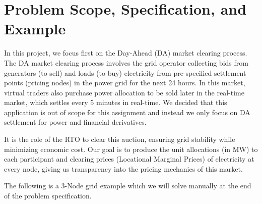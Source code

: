 \documentclass[11pt]{article}
\begin{document}
\begin{abstract}
The goal of this project is to simulate an end-to-end market clearing process for a mock electric grid, deriving electricity prices across the grid, and as an extension, clearing one auction round in the electricity derivatives market for a product called Financial Transmission Rights (FTR). We believe this application to be especially enriching to those of us exploring a career in electricity trading, as well as serving as insight into the pricing mechanics of this market in the age of surging power prices due to the rising adoption of datacenters and Artificial Intelligence.
\end{abstract}

\newpage
\tableofcontents
\newpage

\section{Problem Scope, Specification, and Example}



In this project, we focus first on the Day-Ahead (DA) market clearing process. The DA market clearing process involves the grid operator collecting bids from generators (to sell) and loads (to buy) electricity from pre-specified settlement points (pricing nodes) in the power grid for the next 24 hours. In this market, virtual traders also purchase power allocation to be sold later in the real-time market, which settles every 5 minutes in real-time. We decided that this application is out of scope for this assignment and instead we only focus on DA settlement for power and financial derivatives.

It is the role of the RTO to clear this auction, ensuring grid stability while minimizing economic cost. Our goal is to produce the unit allocations (in MW) to each participant and clearing prices (Locational Marginal Prices) of electricity at every node, giving us transparency into the pricing mechanics of this market.

The following is a 3-Node grid example which we will solve manually at the end of the problem specification.
\end{document}
